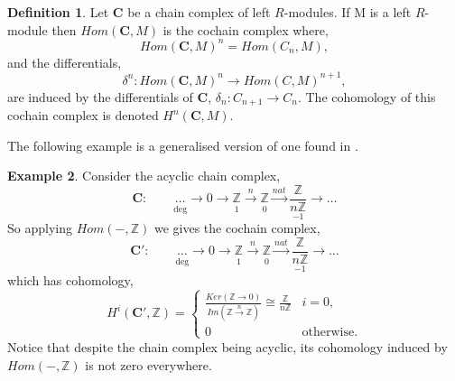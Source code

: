 \documentclass[11.5pt, twoside, a4paper, titlepage]{report}
\providecommand{\equ}[0]{\begin{equation*}}
\providecommand{\eequ}[0] {\end{equation*}}
\providecommand{\bb}[1]{\mathbb{#1}}
\theoremstyle{definition}
\newtheorem{mydef}{Definition}[section]
\newtheorem{eg}[mydef]{Example}
\theoremstyle{plain}
\begin{document}
\begin{mydef}
Let $\mathbf{C}$ be a chain complex of left $R$-modules. If M is a left $R$-module then \emph{$Hom(\mathbf{C}, M)$} is the cochain complex where,
\equ
Hom(\mathbf{C}, M)^n=Hom(C_n, M),
\eequ
and the differentials, 
\equ
\delta^n: Hom(\mathbf{C}, M)^n \to Hom(C, M)^{n+1},
\eequ
are induced by the differentials of $\mathbf{C}$, $\delta_n:C_{n+1}\to C_n$. The cohomology of this cochain complex is denoted $H^n(\mathbf{C}, M)$.
\end{mydef}

The following example is a generalised version of one found in \cite{CB1}.

\begin{eg}
Consider the acyclic chain complex, 
\equ
\mathbf{C}: \qquad \underset{\text{deg}}{\underset{}{\dots}} \xrightarrow{}0 \xrightarrow{} \underset{1}{\underset{}{\bb{Z}}} \xrightarrow{n} \underset{0}{\underset{}{\bb{Z}}} \xrightarrow{nat} \underset{-1}{\frac{\bb{Z}}{n\bb{Z}}} \xrightarrow{} \dots
\eequ
So applying $Hom(-, \bb{Z})$ we gives the cochain complex, 
\equ
\mathbf{C'}: \qquad \underset{\text{deg}}{\underset{}{\dots}} \xrightarrow{}0 \xrightarrow{} \underset{1}{\underset{}{\bb{Z}}} \xrightarrow{n} \underset{0}{\underset{}{\bb{Z}}} \xrightarrow{nat} \underset{-1}{\frac{\bb{Z}}{n\bb{Z}}} \xrightarrow{} \dots
\eequ
which has cohomology,
\equ
H^i(\mathbf{C'}, \bb{Z})=
\begin{cases}
\frac{Ker(\bb{Z}\to0)}{Im(\bb{Z}\xrightarrow{n}\bb{Z})} \cong \frac{\bb{Z}}{n\bb{Z}} & i=0, \\
0 & \text{otherwise.}
\end{cases}
\eequ
Notice that despite the chain complex being acyclic, its cohomology induced by $Hom(-, \bb{Z})$  is not zero everywhere.
\end{eg}
\end{document}
